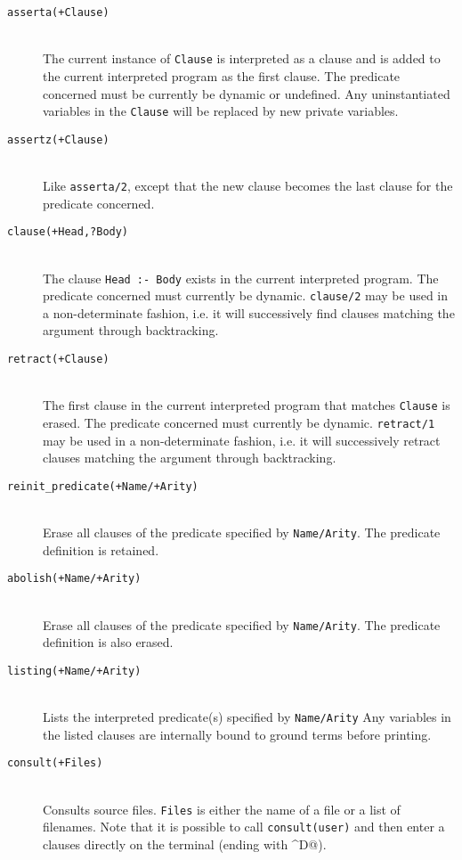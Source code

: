 \begin{description}

\item [{\tt asserta(+Clause)}]~\\
	The current instance of {\tt Clause} is interpreted as a
	clause and is added to the current interpreted program as the
	first clause.  The
	predicate concerned must be currently be dynamic or undefined.
	Any uninstantiated variables in the  {\tt Clause} will be replaced by
	new private variables. 

\item [{\tt assertz(+Clause)}]~\\
	Like {\tt asserta/2}, except that the new clause becomes the
	last clause for the predicate concerned.

\item [{\tt clause(+Head,?Body)}]~\\
	The clause {\tt Head~:-~Body} exists in the current
	interpreted program.  The predicate concerned must currently
	be dynamic.  {\tt clause/2} may be used in a non-determinate fashion,
	i.e. it will successively find clauses matching the
	argument through backtracking. 

\item [{\tt retract(+Clause)}]~\\
	The first clause in the current interpreted program that matches
	{\tt Clause} is erased.  The predicate concerned must currently be
	dynamic.  {\tt retract/1} may be used in a non-determinate fashion,
	i.e. it will successively retract clauses matching the
	argument through backtracking. 

\item [{\tt reinit\_predicate(+Name/+Arity)}]~\\
	Erase all clauses of the predicate specified by {\tt Name/Arity}.
	The predicate definition is retained. 


\item [{\tt abolish(+Name/+Arity)}]~\\
	Erase all clauses of the predicate specified by {\tt Name/Arity}.
	The predicate definition is also erased.

\item [{\tt listing(+Name/+Arity)}]~\\
	Lists the interpreted predicate(s) specified by {\tt Name/Arity}
	Any variables in the listed clauses are internally bound to ground
	terms before printing.

\item [{\tt consult(+Files)}]~\\
	Consults source files. {\tt Files} is either the name of a file
	or a list of filenames. Note that it is possible to call
	{\tt consult(user)} and then enter a clauses directly on the
	terminal (ending with \verb@^D@).


\end{description}
